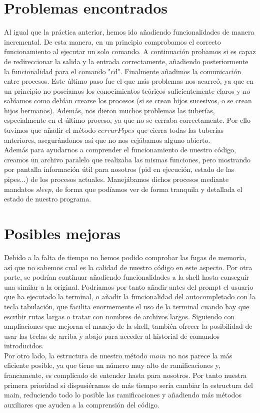 \section{Problemas encontrados}
Al igual que la práctica anterior, hemos ido añadiendo funcionalidades de manera incremental. De esta manera, en un principio comprobamos el correcto funcionamiento al ejecutar un solo comando. A continuación probamos si es capaz de redireccionar la salida y la entrada correctamente, añadiendo posteriormente la funcionalidad para el comando "cd". Finalmente añadimos la comunicación entre procesos. Este último paso fue el que más problemas nos acarreó, ya que en un principio no poseíamos los conocimientos teóricos suficientemente claros y no sabíamos como debían crearse los procesos (si se crean hijos sucesivos, o se crean hijos hermanos). Además, nos dieron muchos problemas las tuberías, especialmente en el último proceso, ya que no se cerraba correctamente. Por ello tuvimos que añadir el método $cerrarPipes$ que cierra todas las tuberías anteriores, asegurándonos así que no nos cejábamos alguno abierto.\\
Además para ayudarnos a comprender el funcionamiento de nuestro código, creamos un archivo paralelo que realizaba las mismas funciones, pero mostrando por pantalla información útil para nosotros (pid en ejecución, estado de las pipes...) de los procesos actuales. Manejábamos dichos procesos mediante mandatos $sleep$, de forma que podíamos ver de forma tranquila y detallada el estado de nuestro programa.
\section{Posibles mejoras}
Debido a la falta de tiempo no hemos podido comprobar las fugas de memoria, así que no sabemos cual es la calidad de nuestro código en este aspecto. Por otra parte, se podrían continuar añadiendo funcionalidades a la shell hasta conseguir una similar a la original. Podríamos por tanto añadir antes del prompt el usuario que ha ejecutado la terminal, o añadir la funcionalidad del autocompletado con la tecla tabulación, que facilita enormemente el uso de la terminal cuando hay que escribir rutas largas o tratar con nombres de archivos largos. Siguiendo con ampliaciones que mejoran el manejo de la shell, también ofrecer la posibilidad de usar las teclas de arriba y abajo para acceder al historial de comandos introducidos.\\
Por otro lado, la estructura de nuestro método $main$ no nos parece la más eficiente posible, ya que tiene un número muy alto de ramificaciones y, francamente, es complicado de entender hasta para nosotros. Por tanto nuestra primera prioridad si dispusiéramos de más tiempo sería cambiar la estructura del main, reduciendo todo lo posible las ramificaciones y añadiendo más métodos auxiliares que ayuden a la comprensión del código. 
\newpage
